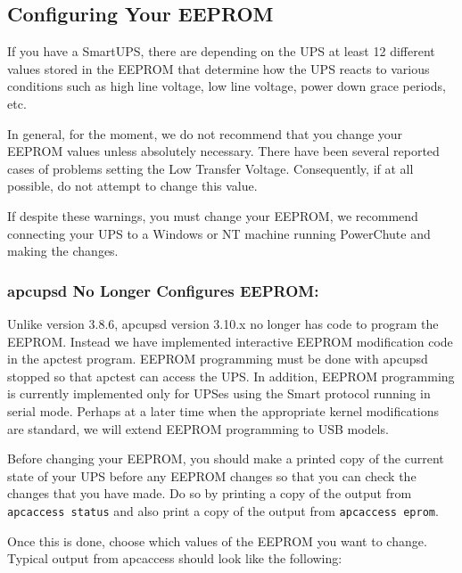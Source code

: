 {{{{{{{{{\label{Configuring-Your-EEPROM}

\subsection*{Configuring Your EEPROM}

\label{index-eeprom_002c-configuring-140}
\label{index-Configuring_002c-eeprom-141}
If you have a SmartUPS, there are depending on the UPS at least 12 different
values stored in the EEPROM that determine how the UPS reacts to various
conditions such as high line voltage, low line voltage, power down grace
periods, etc.  

In general, for the moment, we do not recommend that you change your EEPROM
values unless absolutely necessary. There have been several reported cases of
problems setting the Low Transfer Voltage. Consequently, if at all possible,
do not attempt to change this value.  

If despite these warnings, you must change your EEPROM, we recommend
connecting your UPS to a Windows or NT machine running PowerChute and making
the changes. 

\label{apcupsd-No-Longer-Configures-EEPROM}

\subsubsection*{apcupsd No Longer Configures EEPROM:}

Unlike version 3.8.6, apcupsd version 3.10.x no longer has code to program the
EEPROM. Instead we have implemented interactive EEPROM modification code in
the apctest program. EEPROM programming must be done with apcupsd stopped so
that apctest can access the UPS. In addition, EEPROM programming is currently
implemented only for UPSes using the Smart protocol running in serial mode.
Perhaps at a later time when the appropriate kernel modifications are
standard, we will extend EEPROM programming to USB models.  

Before changing your EEPROM, you should make a printed copy of the current
state of your UPS before any EEPROM changes so that you can check the changes
that you have made. Do so by printing a copy of the output from {\tt apcaccess
status} and also print a copy of the output from {\tt apcaccess eprom}.  

Once this is done, choose which values of the EEPROM you want to change.
Typical output from apcaccess should look like the following: 

}}}}}}}}}
